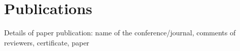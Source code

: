 \section*{Publications}
Details of paper publication: name of the conference/journal, comments of reviewers, certificate, paper